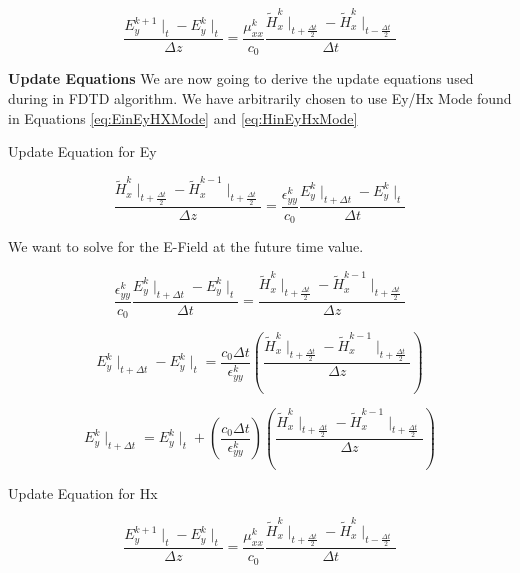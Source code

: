 \documentclass[a4paper,10pt]{article}
\begin{document}
\begin{equation}
  \label{eq:HinEyHxMode}
  \frac{E_{y}^{k+1}\mid_{t} - E_{y}^{k}\mid_{t}}{\Delta z} = \frac{\mu_{xx}^{k}}{c_0} \frac{\tilde{H}_{x}^{k}\mid_{t+\frac  {\Delta t}{2}} - \tilde{H}_{x}^{k}\mid_{t-\frac{\Delta t}{2}}}{\Delta t}
\end{equation}


\textbf{Update Equations}
We are now going to derive the update equations used during in FDTD algorithm.  We have arbitrarily chosen to use Ey/Hx Mode found in Equations \eqref{eq:EinEyHXMode} and \eqref{eq:HinEyHxMode}

Update Equation for Ey

\begin{equation*}
  \frac{\tilde{H}_{x}^{k}\mid_{t+\frac{\Delta t}{2}} - \tilde{H}_{x}^{k-1}\mid_{t+\frac  {\Delta t}{2}}}{\Delta z} = \frac{\epsilon_{yy}^{k}}{c_0} \frac{E_{y}^{k}\mid_{t+\Delta t} - E_{y}^{k}\mid_{t}}{\Delta t}
\end{equation*}

We want to solve for the E-Field at the future time value.

\begin{equation*}
  \frac{\epsilon_{yy}^{k}}{c_0} \frac{E_{y}^{k}\mid_{t+\Delta t} - E_{y}^{k}\mid_{t}}{\Delta t} = \frac{\tilde{H}_{x}^{k}\mid_{t+\frac{\Delta t}{2}} - \tilde{H}_{x}^{k-1}\mid_{t+\frac  {\Delta t}{2}}}{\Delta z}
\end{equation*}

\begin{equation*}
  E_{y}^{k}\mid_{t+\Delta t} - E_{y}^{k}\mid_{t} = \frac{c_0\Delta t}{\epsilon_{yy}^{k}} \left(\frac{\tilde{H}_{x}^{k}\mid_{t+\frac{\Delta t}{2}} - \tilde{H}_{x}^{k-1}\mid_{t+\frac  {\Delta t}{2}}}{\Delta z}\right)
\end{equation*}

\begin{equation}
  E_{y}^{k}\mid_{t+\Delta t} = E_{y}^{k}\mid_{t} + \left(\frac{c_0\Delta t}{\epsilon_{yy}^{k}}\right) \left( \frac{\tilde{H}_{x}^{k}\mid_{t+\frac{\Delta t}{2}} - \tilde{H}_{x}^{k-1}\mid_{t+\frac  {\Delta t}{2}}}{\Delta z}\right)
\end{equation}


Update Equation for Hx

\begin{equation*}
  \frac{E_{y}^{k+1}\mid_{t} - E_{y}^{k}\mid_{t}}{\Delta z} = \frac{\mu_{xx}^{k}}{c_0} \frac{\tilde{H}_{x}^{k}\mid_{t+\frac  {\Delta t}{2}} - \tilde{H}_{x}^{k}\mid_{t-\frac{\Delta t}{2}}}{\Delta t}
\end{equation*}
\end{document}
